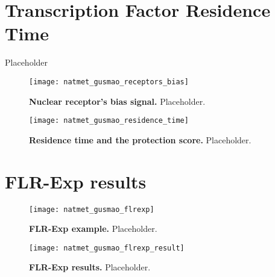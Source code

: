 \section{Transcription Factor Residence Time}
\label{sec:tf.residence.time}

Placeholder

\begin{figure}[h!]
\centering
\texttt{[image: natmet\_gusmao\_receptors\_bias]}
\caption[Nuclear receptor's bias signal]{\textbf{Nuclear receptor's bias signal.} Placeholder.}
\label{fig:natmet_gusmao_receptors_bias}
\end{figure}

\begin{figure}[h!]
\centering
\texttt{[image: natmet\_gusmao\_residence\_time]}
\caption[Residence time and the protection score]{\textbf{Residence time and the protection score.} Placeholder.}
\label{fig:natmet_gusmao_residence_time}
\end{figure}

\section{FLR-Exp results}
\label{sec:flrexp.results}

\begin{figure}[h!]
\centering
\texttt{[image: natmet\_gusmao\_flrexp]}
\caption[FLR-Exp example]{\textbf{FLR-Exp example.} Placeholder.}
\label{fig:natmet_gusmao_flrexp}
\end{figure}

\begin{figure}[h!]
\centering
\texttt{[image: natmet\_gusmao\_flrexp\_result]}
\caption[FLR-Exp results]{\textbf{FLR-Exp results.} Placeholder.}
\label{fig:natmet_gusmao_flrexp_result}
\end{figure}

